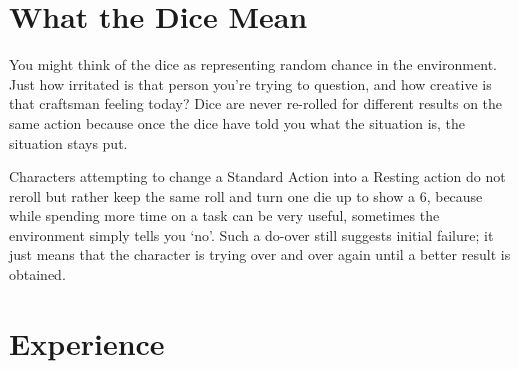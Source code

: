 \section{What the Dice Mean}

\begin{multicols}{2}

You might think of the dice as representing random chance in the environment. Just how irritated is that person you're trying to question, and how creative is that craftsman feeling today? Dice are never re-rolled for different results on the same action because once the dice have told you what the situation is, the situation stays put.

Characters attempting to change a Standard Action into a Resting action do not reroll but rather keep the same roll and turn one die up to show a 6, because while spending more time on a task can be very useful, sometimes the environment simply tells you `no'. Such a do-over still suggests initial failure; it just means that the character is trying over and over again until a better result is obtained.

\end{multicols}

\label{xp}\section{Experience}

